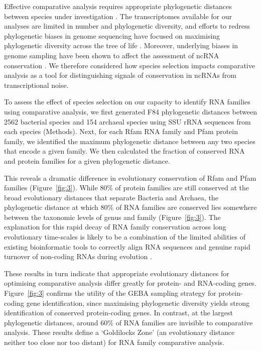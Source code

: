 \documentclass[10pt]{article}
\begin{document}
Effective comparative analysis requires appropriate phylogenetic
distances between species under investigation \cite{Eddy:2005}. The
transcriptomes available for our analyses are limited in number and
phylogenetic diversity, and efforts to redress phylogenetic biases in
genome sequencing have focused on maximising phylogenetic diversity
across the tree of life \cite{Wu:2009,Rinke:2013}. Moreover,
underlying biases in genome sampling have been shown to affect the
assessment of ncRNA conservation \cite{Hoeppner:2012}. We therefore
considered how species selection impacts comparative analysis as a
tool for distinguishing signals of conservation in ncRNAs from
transcriptional noise.

To assess the effect of species selection on our capacity to identify
RNA families using comparative analysis, we first generated F84
phylogenetic distances between 2562 bacterial species and 154 archaeal
species using SSU rRNA sequences from each species (Methods). Next,
for each Rfam RNA family and Pfam protein family, we identified the
maximum phylogenetic distance between any two species that encode a
given family. We then calculated the fraction of conserved RNA and
protein families for a given phylogenetic distance.

This reveals a dramatic difference in evolutionary conservation of
Rfam and Pfam families (Figure~\ref{fig:3}). While 80\% of protein families are
still conserved at the broad evolutionary distances that separate
Bacteria and Archaea, the phylogenetic distance at which 80\% of RNA
families are conserved lies somewhere between the taxonomic levels of
genus and family (Figure~\ref{fig:3}). The explanation for this rapid decay of RNA
family conservation across long evolutionary time-scales is likely to
be a combination of the limited abilities of existing bioinformatic
tools to correctly align RNA sequences \cite{Gardner:2005} and genuine
rapid turnover of non-coding RNAs during evolution
\cite{Hoeppner:2012}.

These results in turn indicate that appropriate evolutionary distances
for optimising comparative analysis differ greatly for protein- and
RNA-coding genes. Figure~\ref{fig:3} confirms the utility of the GEBA sampling
strategy \cite{Wu:2009,Rinke:2013} for protein-coding gene
identification, since maximising phylogenetic diversity yields strong
identification of conserved protein-coding genes. In contrast, at the
largest phylogenetic distances, around 60\% of RNA families are
invisible to comparative analysis. These results define a ‘Goldilocks
Zone’ (an evolutionary distance neither too close nor too distant) for
RNA family comparative analysis.
\end{document}
